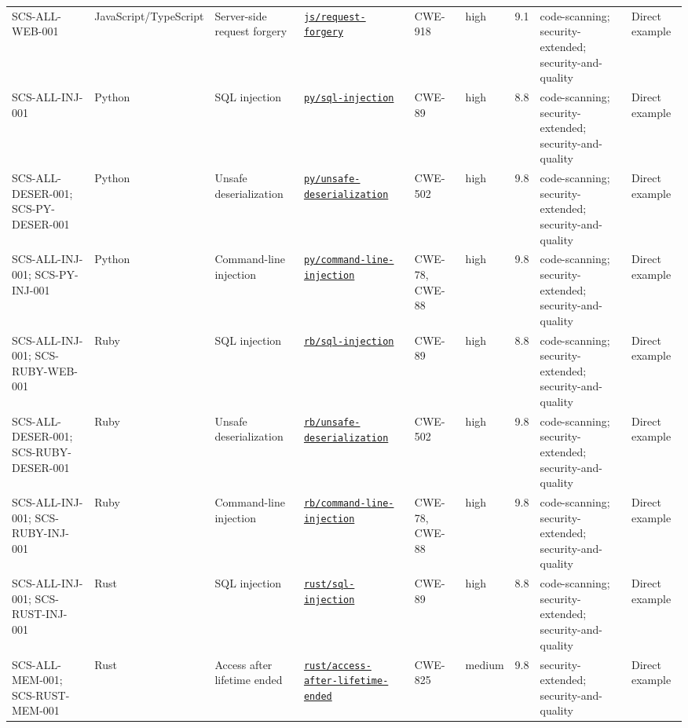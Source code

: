 \documentclass[10pt,letterpaper]{article}
\newcommand{\code}[1]{\begingroup\small\ttfamily\def\UrlFont{\ttfamily}\nolinkurl{#1}\endgroup}
\begin{document}
\begin{landscape}
\begin{longtable}{@{}P{0.95in}P{0.85in}P{1.2in}P{1.55in}P{0.75in}P{0.45in}P{0.45in}P{1.5in}P{0.7in}@{}}
SCS-ALL-WEB-001 & JavaScript/\allowbreak TypeScript & Server-side request forgery & \href{https://codeql.github.com/codeql-query-help/javascript/js-request-forgery/}{\code{js/request-forgery}} & CWE-918 & high & 9.1 & code-scanning; security-extended; security-and-quality & Direct example\\
SCS-ALL-INJ-001 & Python & SQL injection & \href{https://codeql.github.com/codeql-query-help/python/py-sql-injection/}{\code{py/sql-injection}} & CWE-89 & high & 8.8 & code-scanning; security-extended; security-and-quality & Direct example\\
SCS-ALL-DESER-001; SCS-PY-DESER-001 & Python & Unsafe deserialization & \href{https://codeql.github.com/codeql-query-help/python/py-unsafe-deserialization/}{\code{py/unsafe-deserialization}} & CWE-502 & high & 9.8 & code-scanning; security-extended; security-and-quality & Direct example\\
SCS-ALL-INJ-001; SCS-PY-INJ-001 & Python & Command-line injection & \href{https://codeql.github.com/codeql-query-help/python/py-command-line-injection/}{\code{py/command-line-injection}} & CWE-78, CWE-88 & high & 9.8 & code-scanning; security-extended; security-and-quality & Direct example\\
SCS-ALL-INJ-001; SCS-RUBY-WEB-001 & Ruby & SQL injection & \href{https://codeql.github.com/codeql-query-help/ruby/rb-sql-injection/}{\code{rb/sql-injection}} & CWE-89 & high & 8.8 & code-scanning; security-extended; security-and-quality & Direct example\\
SCS-ALL-DESER-001; SCS-RUBY-DESER-001 & Ruby & Unsafe deserialization & \href{https://codeql.github.com/codeql-query-help/ruby/rb-unsafe-deserialization/}{\code{rb/unsafe-deserialization}} & CWE-502 & high & 9.8 & code-scanning; security-extended; security-and-quality & Direct example\\
SCS-ALL-INJ-001; SCS-RUBY-INJ-001 & Ruby & Command-line injection & \href{https://codeql.github.com/codeql-query-help/ruby/rb-command-line-injection/}{\code{rb/command-line-injection}} & CWE-78, CWE-88 & high & 9.8 & code-scanning; security-extended; security-and-quality & Direct example\\
SCS-ALL-INJ-001; SCS-RUST-INJ-001 & Rust & SQL injection & \href{https://codeql.github.com/codeql-query-help/rust/rust-sql-injection/}{\code{rust/sql-injection}} & CWE-89 & high & 8.8 & code-scanning; security-extended; security-and-quality & Direct example\\
SCS-ALL-MEM-001; SCS-RUST-MEM-001 & Rust & Access after lifetime ended & \href{https://codeql.github.com/codeql-query-help/rust/rust-access-after-lifetime-ended/}{\code{rust/access-after-lifetime-ended}} & CWE-825 & medium & 9.8 & security-extended; security-and-quality & Direct example\\

\end{longtable}
\end{landscape}
\end{document}
